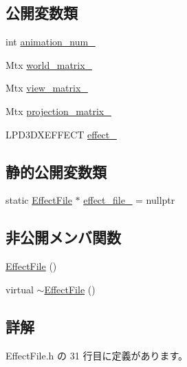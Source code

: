 \subsection*{公開変数類}
\begin{DoxyCompactItemize}
\item 
int \mbox{\hyperlink{class_effect_file_a991ad3cf78c2fcd2301f7f5e0d30b021}{animation\+\_\+num\+\_\+}}
\item 
Mtx \mbox{\hyperlink{class_effect_file_a95cfdd66e61e80e39238d5f889488a43}{world\+\_\+matrix\+\_\+}}
\item 
Mtx \mbox{\hyperlink{class_effect_file_a71209896998fbe94eb0ab4633784e126}{view\+\_\+matrix\+\_\+}}
\item 
Mtx \mbox{\hyperlink{class_effect_file_a3be0a571b431f3e317b53addeb8a284a}{projection\+\_\+matrix\+\_\+}}
\item 
L\+P\+D3\+D\+X\+E\+F\+F\+E\+CT \mbox{\hyperlink{class_effect_file_a77fb809b585787275652c7803cc472dc}{effect\+\_\+}}
\end{DoxyCompactItemize}
\subsection*{静的公開変数類}
\begin{DoxyCompactItemize}
\item 
static \mbox{\hyperlink{class_effect_file}{Effect\+File}} $\ast$ \mbox{\hyperlink{class_effect_file_ad6ff21f4dca6c548cdc57e8f73837086}{effect\+\_\+file\+\_\+}} = nullptr
\end{DoxyCompactItemize}
\subsection*{非公開メンバ関数}
\begin{DoxyCompactItemize}
\item 
\mbox{\hyperlink{class_effect_file_a7c3363080d705db79fada75691d4a9c8}{Effect\+File}} ()
\item 
virtual \mbox{\hyperlink{class_effect_file_ad91db4821340cdcfd855d168a7e3fbf8}{$\sim$\+Effect\+File}} ()
\end{DoxyCompactItemize}


\subsection{詳解}


 Effect\+File.\+h の 31 行目に定義があります。



